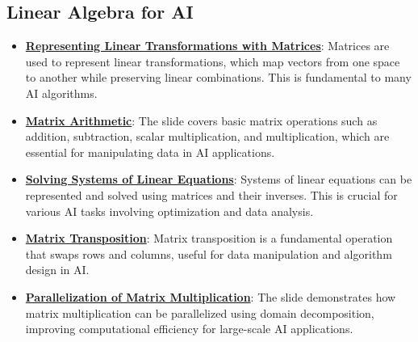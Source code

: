 \documentclass{article}%
\begin{document}
%
\subsection{Linear Algebra for AI}%
\label{subsec:LinearAlgebraforAI}%
\begin{itemize}[leftmargin=*]%
\item \href{https://purdue.brightspace.com/d2l/common/assets/pdfjs-d2l-dist/1.0.14-legacy/web/viewer.html?file=\%2Fcontent\%2Fenforced\%2F1095467-wl.202510.CS.24300.001\%2F04L1-Linear Algebra Primer.pdf\%3Fou\%3D1095467\&lang=en-us\&container=d2l-fileviewer-rendered-pdf\&fullscreen=d2l-fileviewer-rendered-pdf-dialog\&height=667#page=5}{\textbf{Representing Linear Transformations with Matrices}}: Matrices are used to represent linear transformations, which map vectors from one space to another while preserving linear combinations. This is fundamental to many AI algorithms.%
\item \href{https://purdue.brightspace.com/d2l/common/assets/pdfjs-d2l-dist/1.0.14-legacy/web/viewer.html?file=\%2Fcontent\%2Fenforced\%2F1095467-wl.202510.CS.24300.001\%2F04L1-Linear Algebra Primer.pdf\%3Fou\%3D1095467\&lang=en-us\&container=d2l-fileviewer-rendered-pdf\&fullscreen=d2l-fileviewer-rendered-pdf-dialog\&height=667#page=9}{\textbf{Matrix Arithmetic}}: The slide covers basic matrix operations such as addition, subtraction, scalar multiplication, and multiplication, which are essential for manipulating data in AI applications.%
\item \href{https://purdue.brightspace.com/d2l/common/assets/pdfjs-d2l-dist/1.0.14-legacy/web/viewer.html?file=\%2Fcontent\%2Fenforced\%2F1095467-wl.202510.CS.24300.001\%2F04L1-Linear Algebra Primer.pdf\%3Fou\%3D1095467\&lang=en-us\&container=d2l-fileviewer-rendered-pdf\&fullscreen=d2l-fileviewer-rendered-pdf-dialog\&height=667#page=11}{\textbf{Solving Systems of Linear Equations}}: Systems of linear equations can be represented and solved using matrices and their inverses. This is crucial for various AI tasks involving optimization and data analysis.%
\item \href{https://purdue.brightspace.com/d2l/common/assets/pdfjs-d2l-dist/1.0.14-legacy/web/viewer.html?file=\%2Fcontent\%2Fenforced\%2F1095467-wl.202510.CS.24300.001\%2F04L1-Linear Algebra Primer.pdf\%3Fou\%3D1095467\&lang=en-us\&container=d2l-fileviewer-rendered-pdf\&fullscreen=d2l-fileviewer-rendered-pdf-dialog\&height=667#page=16}{\textbf{Matrix Transposition}}: Matrix transposition is a fundamental operation that swaps rows and columns, useful for data manipulation and algorithm design in AI.%
\item \href{https://purdue.brightspace.com/d2l/common/assets/pdfjs-d2l-dist/1.0.14-legacy/web/viewer.html?file=\%2Fcontent\%2Fenforced\%2F1095467-wl.202510.CS.24300.001\%2F04L1-Linear Algebra Primer.pdf\%3Fou\%3D1095467\&lang=en-us\&container=d2l-fileviewer-rendered-pdf\&fullscreen=d2l-fileviewer-rendered-pdf-dialog\&height=667#page=18}{\textbf{Parallelization of Matrix Multiplication}}: The slide demonstrates how matrix multiplication can be parallelized using domain decomposition, improving computational efficiency for large-scale AI applications.%
\end{itemize}
\end{document}
